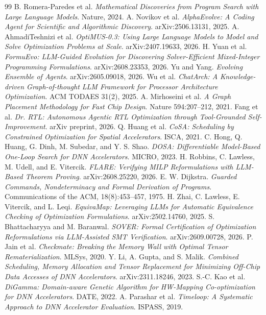 \documentclass[11pt]{article}
\begin{document}
\begin{thebibliography}{99}
\small
{} B. Romera-Paredes et al. \emph{Mathematical Discoveries from Program Search with Large Language Models}. Nature, 2024.
 A. Novikov et al. \emph{AlphaEvolve: A Coding Agent for Scientific and Algorithmic Discovery}. arXiv:2506.13131, 2025.
 A. AhmadiTeshnizi et al. \emph{OptiMUS-0.3: Using Large Language Models to Model and Solve Optimization Problems at Scale}. arXiv:2407.19633, 2026.
 H. Yuan et al. \emph{FormuEvo: LLM-Guided Evolution for Discovering Solver-Efficient Mixed-Integer Programming Formulations}. arXiv:2608.23353, 2026.
 Yu and Yang. \emph{Evolving Ensemble of Agents}. arXiv:2605.09018, 2026.
 Wu et al. \emph{ChatArch: A Knowledge-driven Graph-of-thought LLM Framework for Processor Architecture Optimization}. ACM TODAES 31(2), 2025.
 A. Mirhoseini et al. \emph{A Graph Placement Methodology for Fast Chip Design}. Nature 594:207--212, 2021.
 Fang et al. \emph{Dr. RTL: Autonomous Agentic RTL Optimization through Tool-Grounded Self-Improvement}. arXiv preprint, 2026.
 Q. Huang et al. \emph{CoSA: Scheduling by Constrained Optimization for Spatial Accelerators}. ISCA, 2021.
 C. Hong, Q. Huang, G. Dinh, M. Subedar, and Y. S. Shao. \emph{DOSA: Differentiable Model-Based One-Loop Search for DNN Accelerators}. MICRO, 2023.
 H. Robbins, C. Lawless, M. Udell, and E. Vitercik. \emph{FLARE: Verifying MILP Reformulations with LLM-Based Theorem Proving}. arXiv:2608.25220, 2026.
 E. W. Dijkstra. \emph{Guarded Commands, Nondeterminacy and Formal Derivation of Programs}. Communications of the ACM, 18(8):453--457, 1975.
 H. Zhai, C. Lawless, E. Vitercik, and L. Leqi. \emph{EquivaMap: Leveraging LLMs for Automatic Equivalence Checking of Optimization Formulations}. arXiv:2502.14760, 2025.
 S. Bhattacharyya and M. Baranwal. \emph{SOVER: Formal Certification of Optimization Reformulations via LLM-Assisted SMT Verification}. arXiv:2609.00728, 2026.
 P. Jain et al. \emph{Checkmate: Breaking the Memory Wall with Optimal Tensor Rematerialization}. MLSys, 2020.
 Y. Li, A. Gupta, and S. Malik. \emph{Combined Scheduling, Memory Allocation and Tensor Replacement for Minimizing Off-Chip Data Accesses of DNN Accelerators}. arXiv:2311.18246, 2023.
 S.-C. Kao et al. \emph{DiGamma: Domain-aware Genetic Algorithm for HW-Mapping Co-optimization for DNN Accelerators}. DATE, 2022.
 A. Parashar et al. \emph{Timeloop: A Systematic Approach to DNN Accelerator Evaluation}. ISPASS, 2019.

\end{thebibliography}
\end{document}
